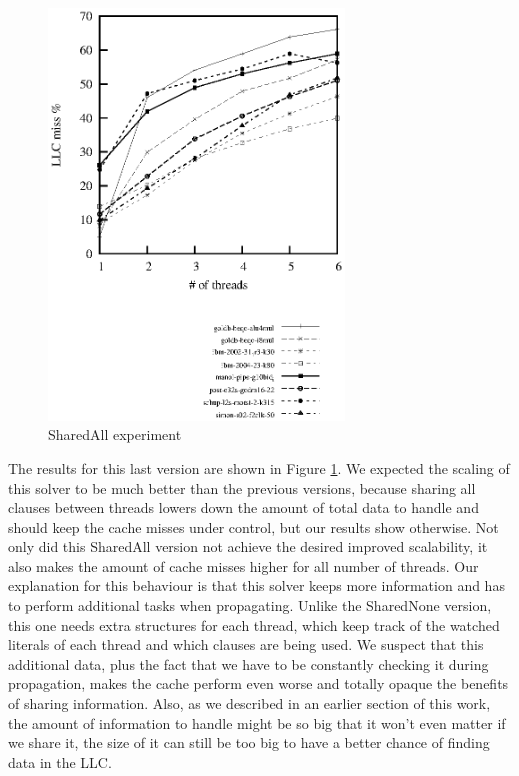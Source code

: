 \documentclass[12pt]{diicc}
\begin{document}
\begin{figure}[h!]
	\centering
		\includegraphics[width=0.7\textwidth]{shared-all}
	\caption{SharedAll experiment}
	\label{fig:shared-all}
\end{figure}

The results for this last version are shown in Figure \ref{fig:shared-all}. We expected the scaling of this solver to be much better than the previous versions, because sharing all clauses between threads lowers down the amount of total data to handle and should keep the cache misses under control, but our results show otherwise. Not only did this SharedAll version not achieve the desired improved scalability, it also makes the amount of cache misses higher for all number of threads. Our explanation for this behaviour is that this solver keeps more information and has to perform additional tasks when propagating. Unlike the SharedNone version, this one needs extra structures for each thread, which keep track of the watched literals of each thread and which clauses are being used. We suspect that this additional data, plus the fact that we have to be constantly checking it during propagation, makes the cache perform even worse and totally opaque the benefits of sharing information. Also, as we described in an earlier section of this work, the amount of information to handle might be so big that it won't even matter if we share it, the size of it can still be too big to have a better chance of finding data in the LLC.
\end{document}
